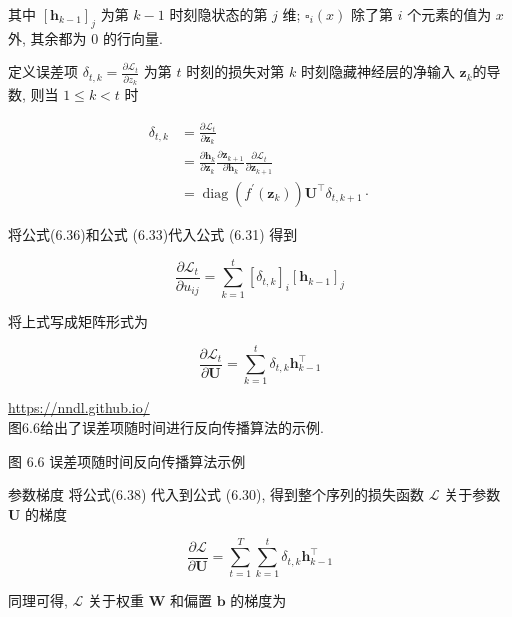 \documentclass[10pt]{article}
\begin{document}
其中 $\left[\boldsymbol{h}_{k-1}\right]_{j}$ 为第 $k-1$ 时刻隐状态的第 $j$ 维; $\square_{i}(x)$ 除了第 $i$ 个元素的值为 $x$ 外, 其余都为 0 的行向量.

定义误差项 $\delta_{t, k}=\frac{\partial \mathcal{L}_{t}}{\partial z_{k}}$ 为第 $t$ 时刻的损失对第 $k$ 时刻隐藏神经层的净输入 $\boldsymbol{z}_{k}$的导数, 则当 $1 \leq k<t$ 时


\begin{align*}
\delta_{t, k} & =\frac{\partial \mathcal{L}_{t}}{\partial \boldsymbol{z}_{k}}  \tag{6.34}\\
& =\frac{\partial \boldsymbol{h}_{k}}{\partial \boldsymbol{z}_{k}} \frac{\partial \boldsymbol{z}_{k+1}}{\partial \boldsymbol{h}_{k}} \frac{\partial \mathcal{L}_{t}}{\partial \boldsymbol{z}_{k+1}}  \tag{6.35}\\
& =\operatorname{diag}\left(f^{\prime}\left(\boldsymbol{z}_{k}\right)\right) \boldsymbol{U}^{\top} \delta_{t, k+1} \cdot \tag{6.36}
\end{align*}


将公式(6.36)和公式 (6.33)代入公式 (6.31) 得到


\begin{equation*}
\frac{\partial \mathcal{L}_{t}}{\partial u_{i j}}=\sum_{k=1}^{t}\left[\delta_{t, k}\right]_{i}\left[\boldsymbol{h}_{k-1}\right]_{j} \tag{6.37}
\end{equation*}


将上式写成矩阵形式为


\begin{equation*}
\frac{\partial \mathcal{L}_{t}}{\partial \boldsymbol{U}}=\sum_{k=1}^{t} \delta_{t, k} \boldsymbol{h}_{k-1}^{\top} \tag{6.38}
\end{equation*}


\href{https://nndl.github.io/}{https://nndl.github.io/}\\
图6.6给出了误差项随时间进行反向传播算法的示例.



图 6.6 误差项随时间反向传播算法示例

参数梯度 将公式(6.38) 代入到公式 (6.30), 得到整个序列的损失函数 $\mathcal{L}$ 关于参数 $\boldsymbol{U}$ 的梯度


\begin{equation*}
\frac{\partial \mathcal{L}}{\partial \boldsymbol{U}}=\sum_{t=1}^{T} \sum_{k=1}^{t} \delta_{t, k} \boldsymbol{h}_{k-1}^{\top} \tag{6.39}
\end{equation*}


同理可得, $\mathcal{L}$ 关于权重 $\boldsymbol{W}$ 和偏置 $\boldsymbol{b}$ 的梯度为
\end{document}
